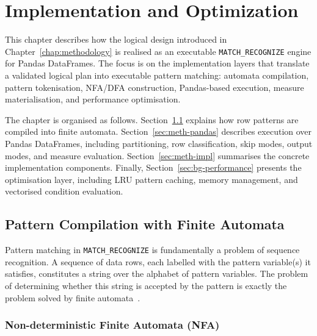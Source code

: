 \providecommand{\mr}{\texttt{MATCH\_RECOGNIZE}}
\chapter{Implementation and Optimization}
\label{chap:implementation}

This chapter describes how the logical design introduced in
Chapter~\ref{chap:methodology} is realised as an executable
\texttt{MATCH\_RECOGNIZE} engine for Pandas DataFrames.  The focus is
on the implementation layers that translate a validated logical plan
into executable pattern matching: automata compilation, pattern
tokenisation, NFA/DFA construction, Pandas-based execution, measure
materialisation, and performance optimisation.

The chapter is organised as follows.  Section~\ref{sec:meth-automata}
explains how row patterns are compiled into finite automata.
Section~\ref{sec:meth-pandas} describes execution over Pandas
DataFrames, including partitioning, row classification, skip modes,
output modes, and measure evaluation.  Section~\ref{sec:meth-impl}
summarises the concrete implementation components.  Finally,
Section~\ref{sec:bg-performance} presents the optimisation layer,
including LRU pattern caching, memory management, and vectorised
condition evaluation.

\section{Pattern Compilation with Finite Automata}
\label{sec:meth-automata}

Pattern matching in \texttt{MATCH\_RECOGNIZE} is fundamentally a
problem of sequence recognition.  A sequence of data rows, each
labelled with the pattern variable(s) it satisfies, constitutes a
string over the alphabet of pattern variables.  The problem of
determining whether this string is accepted by the pattern is
exactly the problem solved by finite automata~\cite{HopcroftUllman}.

\subsection{Non-deterministic Finite Automata (NFA)}
\label{subsec:meth-nfa}


